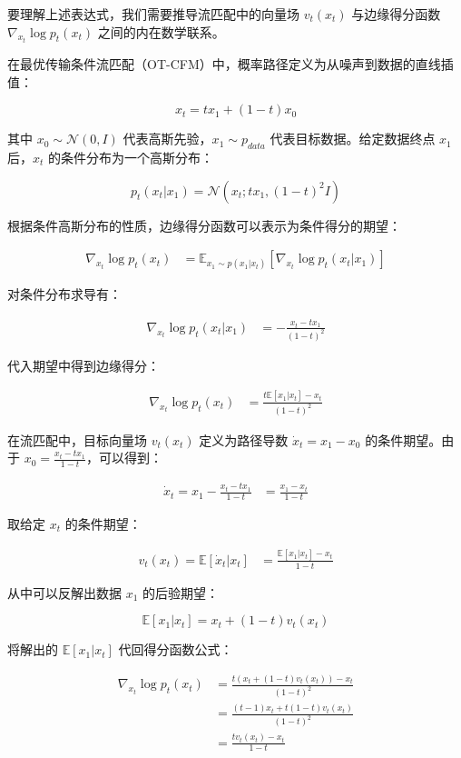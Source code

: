 要理解上述表达式，我们需要推导流匹配中的向量场 \(v_t(x_t)\) 与边缘得分函数 \(\nabla_{x_t}\log p_t(x_t)\) 之间的内在数学联系。

在最优传输条件流匹配（OT-CFM）中，概率路径定义为从噪声到数据的直线插值：

\[
x_t=t x_1+(1-t)x_0
\]

其中 \(x_0\sim\mathcal{N}(0,I)\) 代表高斯先验，\(x_1\sim p_{data}\) 代表目标数据。给定数据终点 \(x_1\) 后，\(x_t\) 的条件分布为一个高斯分布：

\[
p_t(x_t|x_1)=\mathcal{N}\left(x_t;t x_1,(1-t)^2I\right)
\]

根据条件高斯分布的性质，边缘得分函数可以表示为条件得分的期望：

\[
\begin{aligned}
\nabla_{x_t}\log p_t(x_t)
&=
\mathbb{E}_{x_1\sim p(x_1|x_t)}
\left[
\nabla_{x_t}\log p_t(x_t|x_1)
\right]
\end{aligned}
\]

对条件分布求导有：

\[
\begin{aligned}
\nabla_{x_t}\log p_t(x_t|x_1)
&= -\frac{x_t-tx_1}{(1-t)^2}
\end{aligned}
\]

代入期望中得到边缘得分：

\[
\begin{aligned}
\nabla_{x_t}\log p_t(x_t)
&=
\frac{t\mathbb{E}[x_1|x_t]-x_t}{(1-t)^2}
\end{aligned}
\]

在流匹配中，目标向量场 \(v_t(x_t)\) 定义为路径导数 \(\dot{x}_t=x_1-x_0\) 的条件期望。由于 \(x_0=\frac{x_t-tx_1}{1-t}\)，可以得到：

\[
\begin{aligned}
\dot{x}_t=x_1-\frac{x_t-tx_1}{1-t}
&=
\frac{x_1-x_t}{1-t}
\end{aligned}
\]

取给定 \(x_t\) 的条件期望：

\[
\begin{aligned}
v_t(x_t)=\mathbb{E}[\dot{x}_t|x_t]
&=
\frac{\mathbb{E}[x_1|x_t]-x_t}{1-t}
\end{aligned}
\]

从中可以反解出数据 \(x_1\) 的后验期望：

\[
\mathbb{E}[x_1|x_t]=x_t+(1-t)v_t(x_t)
\]

将解出的 \(\mathbb{E}[x_1|x_t]\) 代回得分函数公式：

\[
\begin{aligned}
\nabla_{x_t}\log p_t(x_t)
&=
\frac{t(x_t+(1-t)v_t(x_t))-x_t}{(1-t)^2}
\\
&=
\frac{(t-1)x_t+t(1-t)v_t(x_t)}{(1-t)^2}
\\
&=
\frac{t v_t(x_t)-x_t}{1-t}
\end{aligned}
\]

